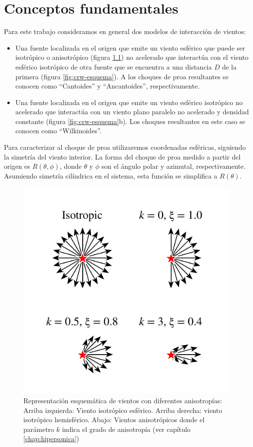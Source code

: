 \chapter{Conceptos fundamentales}
\label{sec:Modelo-generico}
\thispagestyle{empty}
Para este trabajo consideramos en general dos modelos de interacción de vientos:
\begin{itemize}
\item Una fuente localizada en el origen que emite un viento esférico que puede ser isotrópico o anisotrópico (figura \ref{fig:isotropic-aniso}) no acelerado que interactúa con el viento esférico isotrópico de otra fuente que se encuentra a una distancia $D$ de la primera (figura \ref{fig:crw-esquema}). A los choques de proa resultantes se conocen como ``Cantoides'' y ``Ancantoides'', respectivamente.
\item Una fuente localizada en el origen que emite un viento esférico isotrópico no acelerado que interactúa con un viento plano paralelo no acelerado y densidad constante (figura \ref{fig:crw-esquema}b). Los choques resultantes en este caso se conocen como ``Wilkinoides''.
\end{itemize}
Para caracterizar al choque de proa utilizaremos coordenadas esféricas, siguiendo la simetría del viento interior. La forma del choque de proa medido a partir del origen es $R(\theta, \phi)$, donde $\theta$ y $\phi$ son el ángulo polar y azimutal, respectivamente. Asumiendo simetría cilíndrica en el sistema, esta función se simplifica a $R(\theta)$.
\begin{figure}
  \includegraphics[width=0.5\linewidth]{./Figures/anisotropic-arrows}
  \caption{Representación esquemática de vientos con diferentes anisotropías: Arriba izquierda: Viento isotrópico esférico. Arriba derecha: viento isotrópico hemisférico. Abajo: Vientos anisotrópicos donde el parámetro $k$ indica el grado de anisotropía (ver capítulo \ref{chap:hipersonica})}
    \label{fig:isotropic-aniso}
\end{figure}
